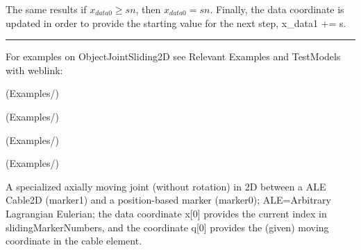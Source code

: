     The same results if $x_{data0}\ge sn$, then $x_{data0} = sn$.
    Finally, the data coordinate is updated in order to provide the starting value for the next step,
    \be
      x_{data1} \;+\!\!= s.
    \ee
\vspace{6pt}\par\noindent\rule{\textwidth}{0.4pt}
%
\noindent For examples on ObjectJointSliding2D see Relevant Examples and TestModels with weblink:
\bi
\item {} (Examples/)
\item {} (Examples/)
\item {} (Examples/)
\item {} (Examples/)

\ei

%
\newpage


\label{sec:item:ObjectJointALEMoving2D}
A specialized axially moving joint (without rotation) in 2D between a ALE Cable2D (marker1) and a position-based marker (marker0); ALE=Arbitrary Lagrangian Eulerian; the data coordinate x[0] provides the current index in slidingMarkerNumbers, and the  coordinate q[0] provides the (given) moving coordinate in the cable element.
\vspace{12pt}\\

